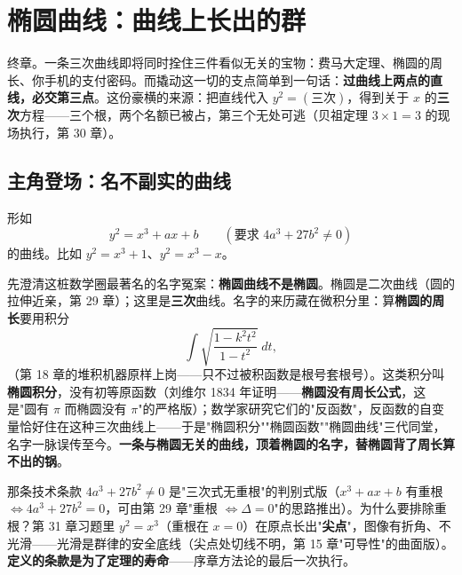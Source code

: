 \chapter{椭圆曲线：曲线上长出的群}

终章。一条三次曲线即将同时拴住三件看似无关的宝物：费马大定理、椭圆的周长、你手机的支付密码。而撬动这一切的支点简单到一句话：\textbf{过曲线上两点的直线，必交第三点}。这份豪横的来源：把直线代入 $y^2 = (\text{三次})$，得到关于 $x$ 的\textbf{三次}方程——三个根，两个名额已被占，第三个无处可逃（贝祖定理 $3\times1 = 3$ 的现场执行，第 30 章）。

\section{主角登场：名不副实的曲线}

\begin{dingyi}
形如
\[
y^2 = x^3 + ax + b \qquad \left(\text{要求 } 4a^3 + 27b^2 \ne 0\right)
\]
的曲线。比如 $y^2 = x^3 + 1$、$y^2 = x^3 - x$。
\end{dingyi}

先澄清这桩数学圈最著名的名字冤案：\textbf{椭圆曲线不是椭圆}。椭圆是二次曲线（圆的拉伸近亲，第 29 章）；这里是\textbf{三次}曲线。名字的来历藏在微积分里：算\textbf{椭圆的周长}要用积分
\[
\int\sqrt{\frac{1 - k^2t^2}{1 - t^2}}\;dt ,
\]
（第 18 章的堆积机器原样上岗——只不过被积函数是根号套根号）。这类积分叫\textbf{椭圆积分}，没有初等原函数（刘维尔 1834 年证明——\textbf{椭圆没有周长公式}，这是"圆有 $\pi$ 而椭圆没有 $\pi$"的严格版）；数学家研究它们的"反函数"，反函数的自变量恰好住在这种三次曲线上——于是"椭圆积分""椭圆函数""椭圆曲线"三代同堂，名字一脉误传至今。\textbf{一条与椭圆无关的曲线，顶着椭圆的名字，替椭圆背了周长算不出的锅}。

那条技术条款 $4a^3 + 27b^2 \ne 0$ 是"三次式无重根"的判别式版（$x^3 + ax + b$ 有重根 $\iff 4a^3 + 27b^2 = 0$，可由第 29 章"重根 $\iff \Delta = 0$"的思路推出）。为什么要排除重根？第 31 章习题里 $y^2 = x^3$（重根在 $x=0$）在原点长出"\textbf{尖点}"，图像有折角、不光滑——光滑是群律的安全底线（尖点处切线不明，第 15 章"可导性"的曲面版）。\textbf{定义的条款是为了定理的寿命}——序章方法论的最后一次执行。


